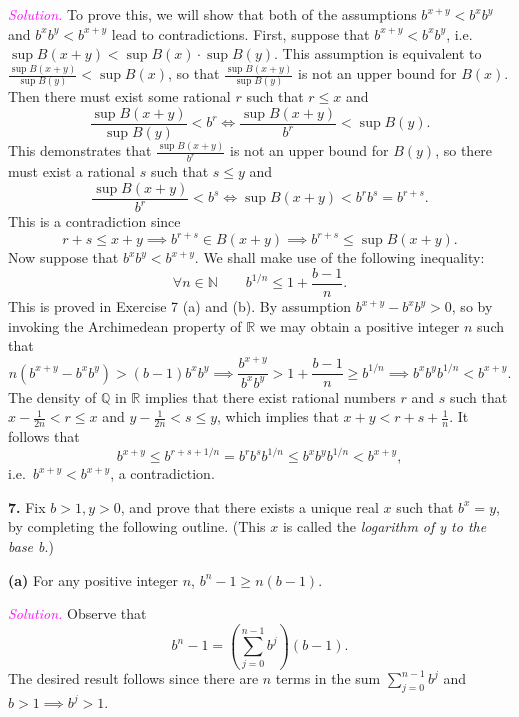 \documentclass[12pt]{article}
\newcommand{\newp}{\vspace{5mm}}
\theoremstyle{definition}
\begin{document}
\textit{\textcolor{magenta}{Solution.}} To prove this, we will show that both of the assumptions \( b^{x+y} < b^x b^y \) and \( b^x b^y < b^{x+y} \) lead to contradictions. First, suppose that \( b^{x+y} < b^x b^y \), i.e.\ \( \sup B(x + y) < \sup B(x) \cdot \sup B(y) \). This assumption is equivalent to \( \frac{\sup B(x + y)}{\sup B(y)} < \sup B(x) \), so that \( \frac{\sup B(x + y)}{\sup B(y)} \) is not an upper bound for \( B(x) \). Then there must exist some rational \( r \) such that \( r \leq x \) and
\[
    \frac{\sup B(x + y)}{\sup B(y)} < b^r \iff \frac{\sup B(x + y)}{b^r} < \sup B(y).
\]
This demonstrates that \( \frac{\sup B(x + y)}{b^r} \) is not an upper bound for \( B(y) \), so there must exist a rational \( s \) such that \( s \leq y \) and
\[
    \frac{\sup B(x + y)}{b^r} < b^s \iff \sup B(x + y) < b^r b^s = b^{r + s}.
\]
This is a contradiction since
\[
    r + s \leq x + y \implies b^{r+s} \in B(x + y) \implies b^{r+s} \leq \sup B(x + y).
\]
Now suppose that \( b^x b^y < b^{x+y} \). We shall make use of the following inequality:
\[
    \forall n \in \mathbb{N} \quad\quad b^{1/n} \leq 1 + \frac{b-1}{n}.
\]
This is proved in Exercise 7 (a) and (b). By assumption \( b^{x+y} - b^x b^y > 0 \), so by invoking the Archimedean property of \( \mathbb{R} \) we may obtain a positive integer \( n \) such that
\[
    n(b^{x+y} - b^x b^y) > (b - 1) b^x b^y \implies \frac{b^{x+y}}{b^x b^y} > 1 + \frac{b-1}{n} \geq b^{1/n} \implies b^x b^y b^{1/n} < b^{x+y}.
\]
The density of \( \mathbb{Q} \) in \( \mathbb{R} \) implies that there exist rational numbers \( r \) and \( s \) such that \( x - \frac{1}{2n} < r \leq x \) and \( y - \frac{1}{2n} < s \leq y \), which implies that \( x + y < r + s + \frac{1}{n} \). It follows that
\[
    b^{x+y} \leq b^{r+s+1/n} = b^r b^s b^{1/n} \leq b^x b^y b^{1/n} < b^{x+y},
\]
i.e.\ \( b^{x+y} < b^{x+y} \), a contradiction.

\newp

\textbf{7.} Fix \( b > 1, y > 0 \), and prove that there exists a unique real \( x \) such that \( b^x = y \), by completing the following outline. (This \( x \) is called the \textit{logarithm of y to the base b}.)

\textbf{(a)} For any positive integer \( n \), \( b^n - 1 \geq n(b - 1) \).

\newp

\textit{\textcolor{magenta}{Solution.}} Observe that
\[
    \textstyle{b^n - 1 = (\sum_{j=0}^{n-1} b^j)}(b - 1).
\]
The desired result follows since there are \( n \) terms in the sum \( \sum_{j=0}^{n-1} b^j\) and \( b > 1 \implies b^j > 1 \).
\end{document}
